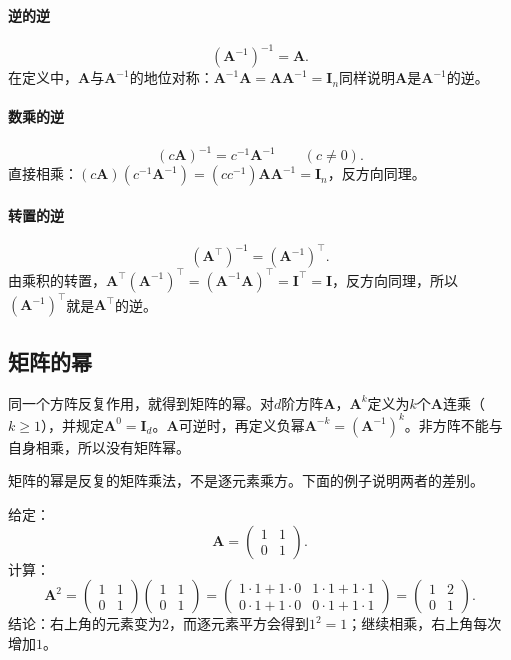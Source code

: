 \paragraph{逆的逆}
\[
 (\bm A^{-1})^{-1}=\bm A.
\]
在定义中，$\bm A$与$\bm A^{-1}$的地位对称：$\bm A^{-1}\bm A=\bm A\bm A^{-1}=\bm I_n$同样说明$\bm A$是$\bm A^{-1}$的逆。

\paragraph{数乘的逆}
\[
 (c\bm A)^{-1}=c^{-1}\bm A^{-1}\qquad(c\neq0).
\]
直接相乘：$(c\bm A)(c^{-1}\bm A^{-1})=(cc^{-1})\bm A\bm A^{-1}=\bm I_n$，反方向同理。

\paragraph{转置的逆}
\[
 (\bm A^\top)^{-1}=(\bm A^{-1})^\top.
\]
由乘积的转置，$\bm A^\top(\bm A^{-1})^\top=(\bm A^{-1}\bm A)^\top=\bm I^\top=\bm I$，反方向同理，所以$(\bm A^{-1})^\top$就是$\bm A^\top$的逆。

\subsection{矩阵的幂}
\label{sec:ls-matrix-power-rules}

同一个方阵反复作用，就得到矩阵的幂。对$d$阶方阵$\bm A$，$\bm A^k$定义为$k$个$\bm A$连乘（$k\geq1$），并规定$\bm A^0=\bm I_d$。$\bm A$可逆时，再定义负幂$\bm A^{-k}=(\bm A^{-1})^k$。非方阵不能与自身相乘，所以没有矩阵幂。

矩阵的幂是反复的矩阵乘法，不是逐元素乘方。下面的例子说明两者的差别。
\begin{example}[矩阵的平方不是逐元素平方]
\label{ex:ls-matrix-square-shear}
给定：
\[
 \bm A=\begin{pmatrix}1&1\\0&1\end{pmatrix}.
\]
计算：
\[
 \bm A^2=\begin{pmatrix}1&1\\0&1\end{pmatrix}\begin{pmatrix}1&1\\0&1\end{pmatrix}
 =\begin{pmatrix}1\cdot1+1\cdot0&1\cdot1+1\cdot1\\0\cdot1+1\cdot0&0\cdot1+1\cdot1\end{pmatrix}
 =\begin{pmatrix}1&2\\0&1\end{pmatrix}.
\]
结论：右上角的元素变为$2$，而逐元素平方会得到$1^2=1$；继续相乘，右上角每次增加$1$。
\end{example}

